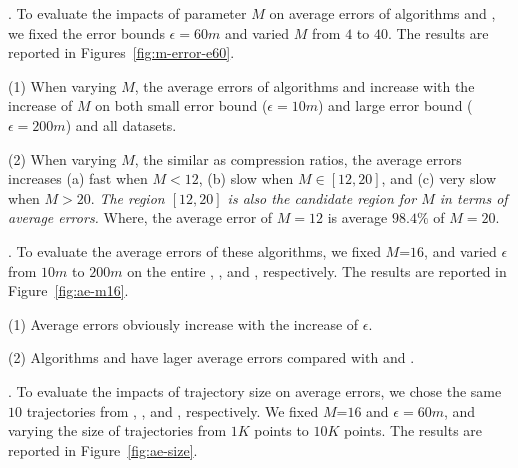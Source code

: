 .
To evaluate the impacts of parameter $M$ on average errors of algorithms \cist and \cista, we fixed the error bounds {$\epsilon =60m$} and varied $M$ from $4$ to $40$.
The results are reported in Figures~\ref{fig:m-error-e60}.




\ni(1) When varying $M$, the average errors of algorithms \cist and \cista increase with the increase of $M$ on both small error bound {(\eg $\epsilon = 10m$)} and large error bound (\eg $\epsilon = 200m$) and all datasets.

\ni(2) When varying $M$, the similar as compression ratios,
 the average errors increases (a) fast when $M < 12$, (b) slow when $M \in [12, 20]$, and (c) very slow when $M  > 20$. \emph{The region $[12, 20]$ is also the candidate region for $M$ in terms of average errors.}
Where, the average error of $M=12$ is average {$98.4\%$} of $M=20$.




.
To evaluate the average errors of these algorithms, we fixed {$M$=$16$}, and varied $\epsilon$ from $10m$ to $200m$ on the entire \truck, \sercar, \geolife and \pricar, respectively.
The results are reported in Figure~\ref{fig:ae-m16}.

\ni(1) Average errors obviously increase with the increase of $\epsilon$.

\ni(2) Algorithms \cist and \cista have lager average errors compared with \dps and \squishe.




.
To evaluate the impacts of trajectory size on average errors, we chose the same {$10$} trajectories from \truck, \sercar, \geolife and \pricar, respectively.
We fixed {$M$=$16$} and $\epsilon = 60m$, and varying the size  of trajectories from $1K$ points to $10K$ points.
%
The results are reported in Figure~\ref{fig:ae-size}.

